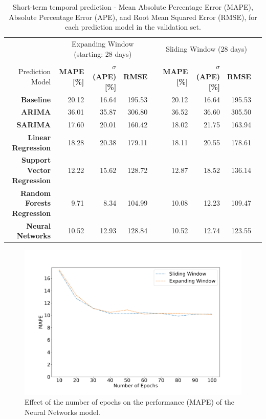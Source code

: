 \begin{table}
\centering
\begin{tabular}{@{}rrrrcrrrr@{}}
\toprule
& \multicolumn{3}{c}{Expanding Window (starting: 28 days)} & \phantom{abc} & \multicolumn{3}{c}{Sliding Window (28 days)} \\
\cmidrule{2-4} \cmidrule{6-8}
 {Prediction Model} & \textbf{MAPE [\%]} & \textbf{$\sigma$(APE) [\%]} & \textbf{RMSE} && \textbf{MAPE [\%]} & \textbf{$\sigma$(APE) [\%]} & \textbf{RMSE} \\ 
 \midrule
  \textbf{Baseline}                     & 20.12 & 16.64 & 195.53 && 20.12 & 16.64 & 195.53 \\
  \textbf{ARIMA}                        & 36.01 & 35.87 & 306.80 && 36.52 & 36.60 & 305.50 \\
  \textbf{SARIMA}                       & 17.60 & 20.01 & 160.42 && 18.02 & 21.75 & 163.94 \\
  \textbf{Linear Regression}            & 18.28 & 20.38 & 179.11 && 18.11 & 20.55 & 178.61 \\
  \textbf{Support Vector Regression}    & 12.22 & 15.62 & 128.72 && 12.87 & 18.52 & 136.14 \\  
  \textbf{Random Forests Regression}    & 9.71  & 8.34  & 104.99 && 10.08 & 12.23 & 109.47 \\
  \textbf{Neural Networks}              & 10.52 & 12.93 & 128.84 && 10.52 & 12.74 & 123.55 \\
\bottomrule
\end{tabular}
\caption{Short-term temporal prediction - Mean Absolute Percentage Error (MAPE), Absolute Percentage Error (APE), and Root Mean Squared Error (RMSE), for each prediction model in the validation set.}
\label{tab:results-dynamic-models}
\end{table}

\begin{figure}
    \begin{center}
            \includegraphics[width=0.65\columnwidth]{figures/temporal_analyses/MAPEEpochs.pdf}
        \caption{Effect of the number of epochs on the performance (MAPE) of the Neural Networks model.}
            \label{fig:epochs-mape}
    \end{center}
\end{figure}

